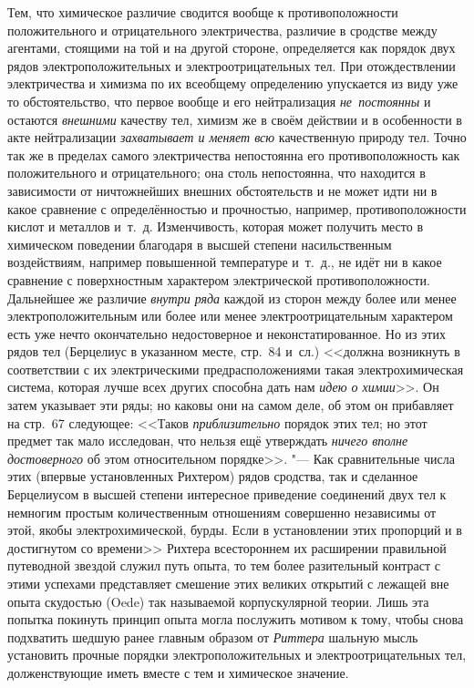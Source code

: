 Тем, что химическое различие сводится вообще к противоположности положительного
и отрицательного электричества, различие в сродстве между агентами, стоящими на
той и на другой стороне, определяется как порядок двух рядов
электроположительных и электроотрицательных тел. При отождествлении
электричества и химизма по их всеобщему определению упускается из виду уже то
обстоятельство, что первое вообще и его нейтрализация {\em не~постоянны} и
остаются {\em внешними} качеству тел, химизм же в своём действии и в
особенности в акте нейтрализации {\em захватывает и меняет всю} качественную
природу тел. Точно так же в пределах самого электричества непостоянна его
противоположность как положительного и отрицательного; она столь непостоянна,
что находится в зависимости от ничтожнейших внешних обстоятельств и не может
идти ни в какое сравнение с определённостью и прочностью, например,
противоположности кислот и металлов и~т.~д. Изменчивость, которая может
получить место в химическом поведении благодаря в высшей степени насильственным
воздействиям, например повышенной температуре и~т.~д., не идёт ни в какое
сравнение с поверхностным характером электрической противоположности.
Дальнейшее же различие {\em внутри ряда} каждой из сторон между более или менее
электроположительным или более или менее электроотрицательным характером есть
уже нечто окончательно недостоверное и неконстатированное. Но из этих рядов тел
(Берцелиус в указанном месте, стр.~84 и~сл.) <<должна возникнуть в соответствии
с их электрическими предрасположениями такая электрохимическая система, которая
лучше всех других способна дать нам {\em идею о химии}>>. Он затем указывает
эти ряды; но каковы они на самом деле, об этом он прибавляет на стр.~67
следующее: <<Таков {\em приблизительно} порядок этих тел; но этот предмет так
мало исследован, что нельзя ещё утверждать {\em ничего вполне достоверного} об
этом относительном порядке>>. "--- Как сравнительные числа этих (впервые
установленных Рихтером) рядов сродства, так и сделанное Берцелиусом в высшей
степени интересное приведение соединений двух тел к немногим простым
количественным отношениям совершенно независимы от этой, якобы
электрохимической, бурды. Если в установлении этих пропорций и в достигнутом со
времени>> Рихтера всестороннем их расширении правильной путеводной звездой
служил путь опыта, то тем более разительный контраст с этими успехами
представляет смешение этих великих открытий с лежащей вне опыта скудостью
(Oede) так называемой корпускулярной теории. Лишь эта попытка покинуть принцип
опыта могла послужить мотивом к тому, чтобы снова подхватить шедшую ранее
главным образом от {\em Риттера} шальную мысль установить прочные порядки
электроположительных и электроотрицательных тел, долженствующие иметь вместе с
тем и химическое значение.

